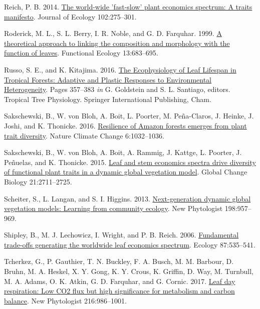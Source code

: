 \documentclass[
  12pt,
]{article}
\newlength{\cslhangindent}
\newlength{\cslentryspacingunit} %
\newenvironment{CSLReferences}[2] %
 {%
  \setlength{\parindent}{0pt}
  \ifodd #1
  \let\oldpar\par
  \def\par{\hangindent=\cslhangindent\oldpar}
  \fi
  \setlength{\parskip}{#2\cslentryspacingunit}
 }%
 {}
\begin{document}
\begin{CSLReferences}{1}{0}
\leavevmode{}%
Reich, P. B. 2014. \href{https://doi.org/10.1111/1365-2745.12211}{The world-wide 'fast-slow' plant economics spectrum: A traits manifesto}. Journal of Ecology 102:275--301.

\leavevmode{}%
Roderick, M. L., S. L. Berry, I. R. Noble, and G. D. Farquhar. 1999. \href{https://doi.org/10.1046/j.1365-2435.1999.00368.x}{A theoretical approach to linking the composition and morphology with the function of leaves}. Functional Ecology 13:683--695.

\leavevmode{}%
Russo, S. E., and K. Kitajima. 2016. \href{https://doi.org/10.1007/978-3-319-27422-5_17}{The {Ecophysiology} of {Leaf Lifespan} in {Tropical Forests}: Adaptive and {Plastic Responses} to {Environmental Heterogeneity}}. Pages 357--383 \emph{in} G. Goldstein and S. L. Santiago, editors. Tropical {Tree Physiology}. {Springer International Publishing}, {Cham}.

\leavevmode{}%
Sakschewski, B., W. von Bloh, A. Boit, L. Poorter, M. Peña-Claros, J. Heinke, J. Joshi, and K. Thonicke. 2016. \href{https://doi.org/10.1038/nclimate3109}{Resilience of {Amazon} forests emerges from plant trait diversity}. Nature Climate Change 6:1032--1036.

\leavevmode{}%
Sakschewski, B., W. von Bloh, A. Boit, A. Rammig, J. Kattge, L. Poorter, J. Peñuelas, and K. Thonicke. 2015. \href{https://doi.org/10.1111/gcb.12870}{Leaf and stem economics spectra drive diversity of functional plant traits in a dynamic global vegetation model}. Global Change Biology 21:2711--2725.

\leavevmode{}%
Scheiter, S., L. Langan, and S. I. Higgins. 2013. \href{https://doi.org/10.1111/nph.12210}{Next-generation dynamic global vegetation models: Learning from community ecology}. New Phytologist 198:957--969.

\leavevmode{}%
Shipley, B., M. J. Lechowicz, I. Wright, and P. B. Reich. 2006. \href{https://doi.org/10.1890/05-1051}{Fundamental trade-offs generating the worldwide leaf economics spectrum}. Ecology 87:535--541.

\leavevmode{}%
Tcherkez, G., P. Gauthier, T. N. Buckley, F. A. Busch, M. M. Barbour, D. Bruhn, M. A. Heskel, X. Y. Gong, K. Y. Crous, K. Griffin, D. Way, M. Turnbull, M. A. Adams, O. K. Atkin, G. D. Farquhar, and G. Cornic. 2017. \href{https://doi.org/10.1111/nph.14816}{Leaf day respiration: Low {CO2} flux but high significance for metabolism and carbon balance}. New Phytologist 216:986--1001.


\end{CSLReferences}
\end{document}
